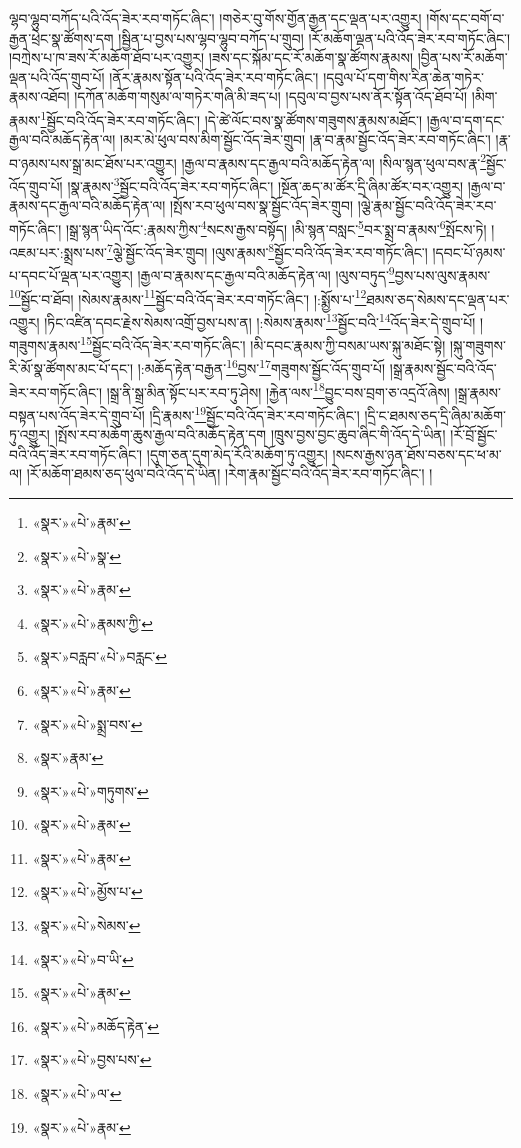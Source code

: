 ལྷབ་ལྷུབ་བཀོད་པའི་འོད་ཟེར་རབ་གཏོང་ཞིང་། །གཅེར་བུ་གོས་གྱོན་རྒྱན་དང་ལྡན་པར་འགྱུར། །གོས་དང་བགོ་བ་རྒྱན་ཕྲེང་སྣ་ཚོགས་དག །སྦྱིན་པ་བྱས་པས་ལྷབ་ལྷུབ་བཀོད་པ་གྲུབ། །རོ་མཆོག་ལྡན་པའི་འོད་ཟེར་རབ་གཏོང་ཞིང་། །བཀྲེས་པ་ཁ་ཟས་རོ་མཆོག་ཐོབ་པར་འགྱུར། །ཟས་དང་སྐོམ་དང་རོ་མཆོག་སྣ་ཚོགས་རྣམས། །བྱིན་པས་རོ་མཆོག་ལྡན་པའི་འོད་གྲུབ་པོ། །ནོར་རྣམས་སྟོན་པའི་འོད་ཟེར་རབ་གཏོང་ཞིང་། །དབུལ་པོ་དག་གིས་རིན་ཆེན་གཏེར་རྣམས་འཐོབ། །དཀོན་མཆོག་གསུམ་ལ་གཏེར་གཞི་མི་ཟད་པ། །དབུལ་བ་བྱས་པས་ནོར་སྟོན་འོད་ཐོབ་པོ། །མིག་རྣམས་\footnote{«སྣར་»«པེ་»རྣམ་}སྦྱོང་བའི་འོད་ཟེར་རབ་གཏོང་ཞིང་། །དེ་ཚེ་ལོང་བས་སྣ་ཚོགས་གཟུགས་རྣམས་མཐོང་། །རྒྱལ་བ་དག་དང་རྒྱལ་བའི་མཆོད་རྟེན་ལ། །མར་མེ་ཕུལ་བས་མིག་སྦྱོང་འོད་ཟེར་གྲུབ། །རྣ་བ་རྣམ་སྦྱོང་འོད་ཟེར་རབ་གཏོང་ཞིང་། །རྣ་བ་ཉམས་པས་སྒྲ་མང་ཐོས་པར་འགྱུར། །རྒྱལ་བ་རྣམས་དང་རྒྱལ་བའི་མཆོད་རྟེན་ལ། །སིལ་སྙན་ཕུལ་བས་རྣ་\footnote{«སྣར་»«པེ་»སྣ་}སྦྱོང་འོད་གྲུབ་པོ། །སྣ་རྣམས་\footnote{«སྣར་»«པེ་»རྣམ་}སྦྱོང་བའི་འོད་ཟེར་རབ་གཏོང་ཞིང་། །སྔོན་ཆད་མ་ཚོར་དྲི་ཞིམ་ཚོར་བར་འགྱུར། །རྒྱལ་བ་རྣམས་དང་རྒྱལ་བའི་མཆོད་རྟེན་ལ། །སྤོས་རབ་ཕུལ་བས་སྣ་སྦྱོང་འོད་ཟེར་གྲུབ། །ལྕེ་རྣམ་སྦྱོང་བའི་འོད་ཟེར་རབ་གཏོང་ཞིང་། །སྒྲ་སྙན་ཡིད་འོང་:རྣམས་ཀྱིས་\footnote{«སྣར་»«པེ་»རྣམས་ཀྱི་}སངས་རྒྱས་བསྟོད། །མི་སྙན་བསླང་\footnote{«སྣར་»བརླབ་«པེ་»བརླང་}བར་སྨྲ་བ་རྣམས་\footnote{«སྣར་»«པེ་»རྣམ་}སྤོངས་ཏེ། །འཇམ་པར་:སྨྲས་པས་\footnote{«སྣར་»«པེ་»སྨྲ་བས་}ལྕེ་སྦྱོང་འོད་ཟེར་གྲུབ། །ལུས་རྣམས་\footnote{«སྣར་»རྣམ་}སྦྱོང་བའི་འོད་ཟེར་རབ་གཏོང་ཞིང་། །དབང་པོ་ཉམས་པ་དབང་པོ་ལྡན་པར་འགྱུར། །རྒྱལ་བ་རྣམས་དང་རྒྱལ་བའི་མཆོད་རྟེན་ལ། །ལུས་བཏུད་\footnote{«སྣར་»«པེ་»གཏུགས་}བྱས་པས་ལུས་རྣམས་\footnote{«སྣར་»«པེ་»རྣམ་}སྦྱོང་བ་ཐོབ། །སེམས་རྣམས་\footnote{«སྣར་»«པེ་»རྣམ་}སྦྱོང་བའི་འོད་ཟེར་རབ་གཏོང་ཞིང་། །:སྨྱོས་པ་\footnote{«སྣར་»«པེ་»མྱོས་པ་}ཐམས་ཅད་སེམས་དང་ལྡན་པར་འགྱུར། །ཏིང་འཛིན་དབང་རྗེས་སེམས་འགྲོ་བྱས་པས་ན། །:སེམས་རྣམས་\footnote{«སྣར་»«པེ་»སེམས་}སྦྱོང་བའི་\footnote{«སྣར་»«པེ་»བ་ཡི་}འོད་ཟེར་དེ་གྲུབ་པོ། །གཟུགས་རྣམས་\footnote{«སྣར་»«པེ་»རྣམ་}སྦྱོང་བའི་འོད་ཟེར་རབ་གཏོང་ཞིང་། །མི་དབང་རྣམས་ཀྱི་བསམ་ཡས་སྐུ་མཐོང་སྟེ། །སྐུ་གཟུགས་རི་མོ་སྣ་ཚོགས་མང་པོ་དང་། །:མཆོད་རྟེན་བརྒྱན་\footnote{«སྣར་»«པེ་»མཆོད་རྟེན་}བྱས་\footnote{«སྣར་»«པེ་»བྱས་པས་}གཟུགས་སྦྱོང་འོད་གྲུབ་པོ། །སྒྲ་རྣམས་སྦྱོང་བའི་འོད་ཟེར་རབ་གཏོང་ཞིང་། །སྒྲ་ནི་སྒྲ་མིན་སྟོང་པར་རབ་ཏུ་ཤེས། །རྐྱེན་ལས་\footnote{«སྣར་»«པེ་»ལ་}བྱུང་བས་བྲག་ཅ་འདྲའོ་ཞེས། །སྒྲ་རྣམས་བསྟན་པས་འོད་ཟེར་དེ་གྲུབ་པོ། །དྲི་རྣམས་\footnote{«སྣར་»«པེ་»རྣམ་}སྦྱོང་བའི་འོད་ཟེར་རབ་གཏོང་ཞིང་། །དྲི་ང་ཐམས་ཅད་དྲི་ཞིམ་མཆོག་ཏུ་འགྱུར། །སྤོས་རབ་མཆོག་ཆུས་རྒྱལ་བའི་མཆོད་རྟེན་དག །ཁྲུས་བྱས་བྱང་ཆུབ་ཞིང་གི་འོད་དེ་ཡིན། །རོ་བྲོ་སྦྱོང་བའི་འོད་ཟེར་རབ་གཏོང་ཞིང་། །དུག་ཅན་དུག་མེད་རོའི་མཆོག་ཏུ་འགྱུར། །སངས་རྒྱས་ཉན་ཐོས་བཅས་དང་ཕ་མ་ལ། །རོ་མཆོག་ཐམས་ཅད་ཕུལ་བའི་འོད་དེ་ཡིན། །རེག་རྣམ་སྦྱོང་བའི་འོད་ཟེར་རབ་གཏོང་ཞིང་། །
